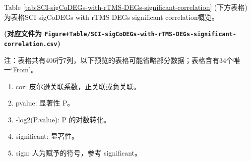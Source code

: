 \documentclass[
]{article}
\providecommand{\tightlist}{%
  \setlength{\itemsep}{0pt}\setlength{\parskip}{0pt}}
\begin{document}
Table \ref{tab:SCI-sigCoDEGs-with-rTMS-DEGs-significant-correlation} (下方表格) 为表格SCI sigCoDEGs with rTMS DEGs significant correlation概览。

\textbf{(对应文件为 \texttt{Figure+Table/SCI-sigCoDEGs-with-rTMS-DEGs-significant-correlation.csv})}

\begin{center}\begin{tcolorbox}[colback=gray!10, colframe=gray!50, width=0.9\linewidth, arc=1mm, boxrule=0.5pt]注：表格共有406行7列，以下预览的表格可能省略部分数据；表格含有34个唯一`From'。
\end{tcolorbox}
\end{center}
\begin{center}\begin{tcolorbox}[colback=gray!10, colframe=gray!50, width=0.9\linewidth, arc=1mm, boxrule=0.5pt]\begin{enumerate}\tightlist
\item cor: 皮尔逊关联系数，正关联或负关联。
\item pvalue: 显著性 P。
\item -log2(P.value): P 的对数转化。
\item significant: 显著性。
\item sign: 人为赋予的符号，参考 significant。
\end{enumerate}\end{tcolorbox}
\end{center}
\end{document}
